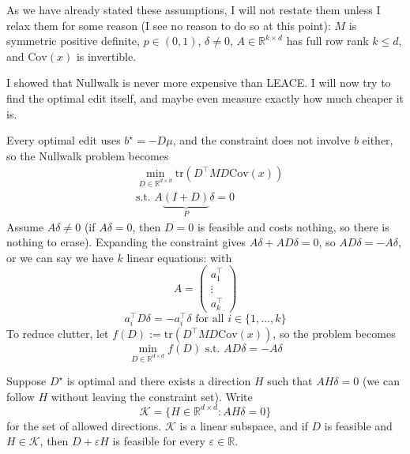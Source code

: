\documentclass[10pt,a4paper,twocolumn]{article}
\newcommand{\R}{\mathbb{R}}
\begin{document}
	As we have already stated these assumptions, I will not restate them unless I relax them for some reason (I see no reason to do so at this point): $M$ is symmetric positive definite, $p \in (0, 1)$, $\delta \ne 0$, $A \in \R^{k \times d}$ has full row rank $k \le d$, and $\mathrm{Cov}(x)$ is invertible.

	I showed that Nullwalk is never more expensive than LEACE. I will now try to find the optimal edit itself, and maybe even measure exactly how much cheaper it is.

	Every optimal edit uses $b^\star = - D \mu$, and the constraint does not involve $b$ either, so the Nullwalk problem becomes
	$$\begin{aligned}
		& \min_{D \in \R^{d \times d}} \mathrm{tr} \left( D^\top M D \mathrm{Cov}(x) \right) \\
		& \text{s.t. } A \underbrace{(I + D)}_{P} \delta = 0
	\end{aligned}$$
	Assume $A \delta \ne 0$ (if $A \delta = 0$, then $D = 0$ is feasible and costs nothing, so there is nothing to erase). Expanding the constraint gives $A \delta + A D \delta = 0$, so $A D \delta = - A \delta$, or we can say we have $k$ linear equations: with
	$$A = \begin{pmatrix} a_1^\top \\ \vdots \\ a_k^\top \end{pmatrix}$$
	$$a_i^\top D \delta = - a_i^\top \delta \text{ for all } i \in \{1, \dots, k\}$$
	To reduce clutter, let $f(D) := \mathrm{tr} \left( D^\top M D \mathrm{Cov}(x) \right)$, so the problem becomes
	$$\min_{D \in \R^{d \times d}} f(D) \text{ s.t. } A D \delta = - A \delta$$

	Suppose $D^\star$ is optimal and there exists a direction $H$ such that $A H \delta = 0$ (we can follow $H$ without leaving the constraint set). Write
	$$\mathcal{K} = \{ H \in \R^{d \times d} : A H \delta = 0 \}$$
	for the set of allowed directions. $\mathcal{K}$ is a linear subspace, and if $D$ is feasible and $H \in \mathcal{K}$, then $D + \varepsilon H$ is feasible for every $\varepsilon \in \R$.
\end{document}
